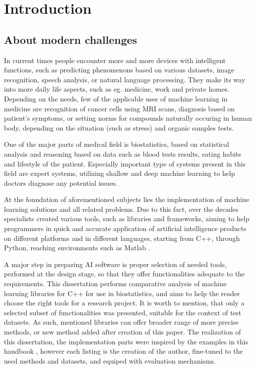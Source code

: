 \chapter{Introduction}
\section{About modern challenges} %

In current times people encounter more and more devices with intelligent functions, such as predicting phenomenons based on various datasets, image recognition, speech analysis, or natural language processing. They make its way into more daily life aspects, such as eg. medicine, work and private homes. Depending on the needs, few of the applicable uses of machine learning in medicine are recognition of cancer cells using MRI scans, diagnosis based on patient's symptoms, or setting norms for compounds naturally occuring in human body, depending on the situation (such as stress) and organic samples tests.

One of the major parts of medical field is biostatistics, based on statistical analysis and reasoning based on data such as blood tests results, eating habits and lifestyle of the patient. Especially important type of systems present in this field are expert systems, utilizing shallow and deep machine learning to help doctors diagnose any potential issues. \cite{expert}

At the foundation of aforementioned subjects lies the implementation of machine learning solutions and all related problems. Due to this fact, over the decades specialists created various tools, such as libraries and frameworks, aiming to help programmers in quick and accurate application of artificial intelligence products on different platforms and in different languages, starting from C++, through Python, reaching environments such as Matlab \cite{tf_api}.

A major step in preparing AI software is proper selection of needed tools, performed at the design stage, so that they offer functionalities adequate to the requirements. This dissertation performs comparative analysis of machine learning libraries for C++ for use in biostatistics, and aims to help the reader choose the right tools for a research project. It is worth to mention, that only a selected subset of functionalities was presented, suitable for the context of test datasets. As such, mentioned libraries can offer broader range of more precise methods, or new method added after creation of this paper. The realization of this dissertation, the implementation parts were inspired by the examples in this handbook \cite{handsOnMachineLearning}, however each listing is the creation of the author, fine-tuned to the used methods and datasets, and equiped with evaluation mechanisms.

